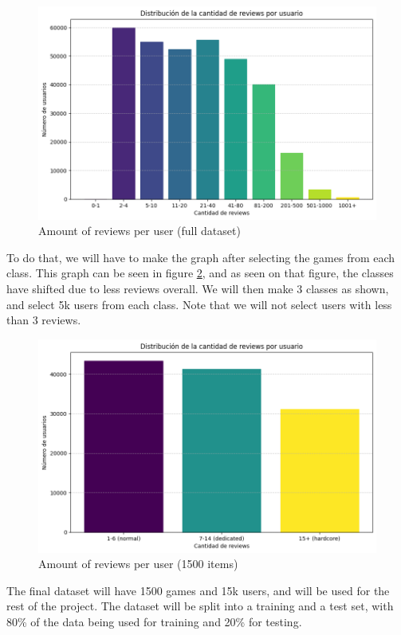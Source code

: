 \documentclass{article}
\begin{document}
\begin{figure}[h]
    \centering
    \includegraphics[width=0.8\linewidth]{reviewsPorUsuario.png}
    \caption{Amount of reviews per user (full dataset)}
    \label{fig:reviewsPorUsuario}
\end{figure}

To do that, we will have to make the graph after selecting the games from each class. This graph can be seen in figure \ref{fig:reviewsPorUsuario2}, and as seen on that figure, the classes have shifted due to less reviews overall. We will then make 3 classes as shown, and select 5k users from each class. Note that we will not select users with less than 3 reviews.

\begin{figure}[h]
    \centering
    \includegraphics[width=0.8\linewidth]{reviewsPorUsuario2.png}
    \caption{Amount of reviews per user (1500 items)}
    \label{fig:reviewsPorUsuario2}
\end{figure}

The final dataset will have 1500 games and 15k users, and will be used for the rest of the project. The dataset will be split into a training and a test set, with 80\% of the data being used for training and 20\% for testing.
\end{document}
